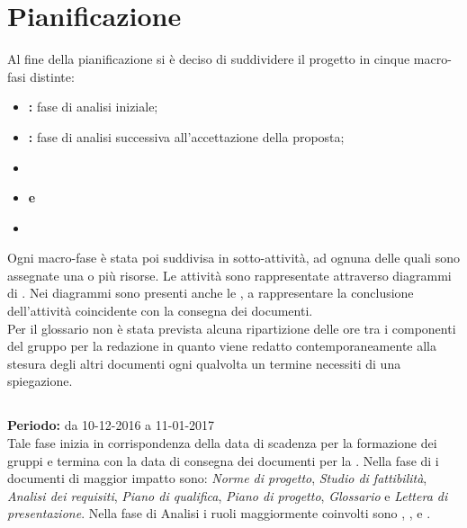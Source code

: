 \section{Pianificazione}

Al fine della pianificazione si è deciso di suddividere il progetto in cinque macro-fasi distinte:
\begin{itemize}
\item \textbf{\AR{}:} fase di analisi iniziale;
\item \textbf{\AD{}:} fase di analisi successiva all'accettazione della proposta;
\item \textbf{\PA{}}
\item \textbf{\PD{} e \Cod{}}
\item \textbf{\VV{}}
\end{itemize}
Ogni macro-fase è stata poi suddivisa in sotto-attività, ad ognuna delle quali sono assegnate una o più risorse. Le attività sono rappresentate attraverso diagrammi di . Nei diagrammi sono presenti anche le , a rappresentare la conclusione dell'attività coincidente con la consegna dei documenti. \\
Per il glossario non è stata prevista alcuna ripartizione delle ore tra i componenti del gruppo per la redazione in quanto viene redatto contemporaneamente alla stesura degli altri documenti ogni qualvolta un termine necessiti di una spiegazione.

\subsection{\AR{}}
\textbf{Periodo:} da 10-12-2016 a 11-01-2017 \\
Tale fase inizia in corrispondenza della data di scadenza per la formazione dei gruppi e termina con la data di consegna dei documenti per la \RR{}. Nella fase di \AR{} i documenti di maggior impatto sono: \textit{Norme di progetto}, \textit{Studio di fattibilità}, \textit{Analisi dei requisiti}, \textit{Piano di qualifica}, \textit{Piano di progetto}, \textit{Glossario} e \textit{Lettera di presentazione}.
Nella fase di Analisi i ruoli maggiormente coinvolti sono \Analista{}, \Responsabile{}, \Amministratore{} e \Verificatore{}.

